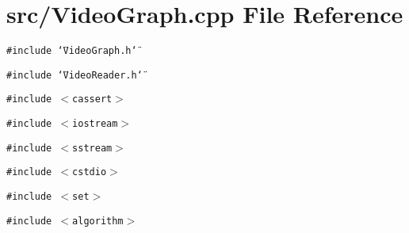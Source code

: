 \section{src/VideoGraph.cpp File Reference}
\label{VideoGraph_8cpp}
{\tt \#include \char`\"{}VideoGraph.h\char`\"{}}\par
{\tt \#include \char`\"{}VideoReader.h\char`\"{}}\par
{\tt \#include $<$cassert$>$}\par
{\tt \#include $<$iostream$>$}\par
{\tt \#include $<$sstream$>$}\par
{\tt \#include $<$cstdio$>$}\par
{\tt \#include $<$set$>$}\par
{\tt \#include $<$algorithm$>$}\par
